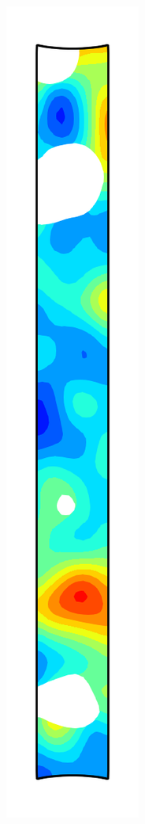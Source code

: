\begin{figure}[!htb]
\begin{subfigure}{0.08\textwidth}
  \end{subfigure}
  \begin{subfigure}{0.08\textwidth}
    \centering
    \includegraphics[width=\textwidth]{Chapter5/figures/spallation/psie_8}

\end{subfigure}
\end{figure}
